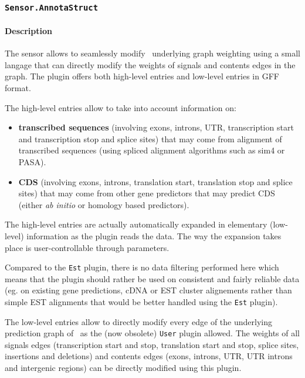 
\subsubsection{\texttt{Sensor.AnnotaStruct}}

\paragraph{Description}

The sensor allows to seamlessly modify \EuGene\ underlying graph
weighting using a small langage that can directly modify the weights
of signals and contents edges in the graph. The plugin offers both
high-level entries and low-level entries in GFF format. 

The high-level entries allow to take into account information on:
\begin{itemize}
\item \textbf{transcribed sequences} (involving exons, introns, UTR,
  transcription start and transcription stop and splice sites) that
  may come from alignment of transcribed sequences (using spliced
  alignment algorithms such as sim4 or PASA).
\item \textbf{CDS} (involving exons, introns, translation start,
  translation stop and splice sites) that may come from other gene
  predictors that may predict CDS (either \emph{ab initio} or homology based
  predictors).
\end{itemize}
The high-level entries are actually automatically expanded in
elementary (low-level) information as the plugin reads the data. The
way the expansion takes place is user-controllable through parameters.

Compared to the \texttt{Est} plugin, there is no data filtering
performed here which means that the plugin should rather be used on
consistent and fairly reliable data (eg. on existing gene predictions,
cDNA or EST cluster alignements rather than simple EST alignments that
would be better handled using the \texttt{Est} plugin).

The low-level entries allow to directly modify every edge of the
underlying prediction graph of \EuGene\ as the (now obsolete)
\texttt{User} plugin allowed. The weights of all signals edges
(transcription start and stop, translation start and stop, splice
sites, insertions and deletions) and contents edges (exons, introns,
UTR, UTR introns and intergenic regions) can be directly modified
using this plugin.

